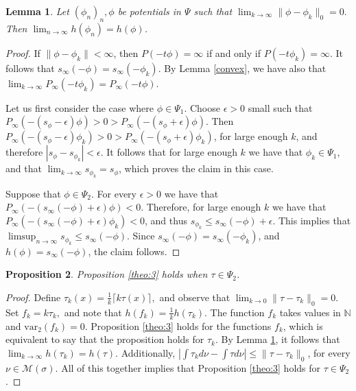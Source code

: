 \documentclass[letterpaper,11pt]{amsart}
\theoremstyle{plain}
\theoremstyle{plain}
\newtheorem{proposition}{Proposition}[subsection]
\newtheorem{lemma}[proposition]{Lemma}
\theoremstyle{definition}
\theoremstyle{remark}
\def\N{{\mathbb N}}
\def\M{{\mathcal M}}
\begin{document}
\begin{lemma}\label{lem:qk} Let $(\phi_n)_n, \phi$ be potentials in $\Psi$  such that $\lim_{k\to\infty}\|\phi-\phi_k\|_0=0.$ Then $\lim_{n\to\infty}h(\phi_n)=h(\phi)$.\end{lemma}

\begin{proof} If $\|\phi-\phi_k\|<\infty$, then $P(-t\phi)=\infty$ if and only if $P(-t\phi_k)=\infty$. It follows that $s_\infty(-\phi)=s_\infty(-\phi_k)$. 
By Lemma \ref{convex}, we have also that $\lim_{k\to\infty} P_\infty(-t\phi_k)=P_\infty(-t\phi)$.

Let us first consider the case where $\phi\in\Psi_1$. Choose $\epsilon>0$ small such that $P_\infty(-(s_\phi-\epsilon)\phi)>0>P_\infty(-(s_\phi+\epsilon)\phi)$. Then $P_\infty(-(s_\phi-\epsilon)\phi_k)>0>P_\infty(-(s_\phi+\epsilon)\phi_k)$, for large enough $k$, and therefore $|s_\phi-s_{\phi_k}|<\epsilon$. It follows that for large enough $k$ we have that $\phi_k\in\Psi_1$, and that $\lim_{k\to\infty}s_{\phi_k}=s_\phi$, which proves the claim in this case.

Suppose that $\phi\in\Psi_2$. For every $\epsilon>0$ we have that $P_\infty(-(s_\infty(-\phi)+\epsilon)\phi)<0$.  Therefore, for large enough $k$ we have that $P_\infty(-(s_\infty(-\phi)+\epsilon)\phi_k)<0$, and thus $s_{\phi_k}\le s_\infty(-\phi)+\epsilon$. This implies that $\limsup_{n\to\infty} s_{\phi_k}\le s_\infty(-\phi)$. Since $s_\infty(-\phi)=s_\infty(-\phi_k)$, and $h(\phi)=s_\infty(-\phi)$, the claim follows.
\end{proof}

\begin{proposition}\label{lem:lc2} Proposition \ref{theo:3} holds when $\tau\in\Psi_2$.
\end{proposition}
\begin{proof} Define $\tau_k(x)=\frac{1}{k}\lceil  k\tau(x)\rceil,$ and observe that $\lim_{k\to 0}\|\tau-\tau_k\|_0=0$. Set $f_k=k\tau_k,$ and note that $h(f_k)=\frac{1}{k}h(\tau_k)$. The function $f_k$ takes values in $\N$ and $\text{var}_2(f_k)=0$. Proposition \ref{theo:3} holds for the functions $f_k$, which is equivalent to say that the proposition holds for $\tau_k$. By Lemma \ref{lem:qk}, it follows that $\lim_{k\to\infty}h(\tau_k)=h(\tau)$. Additionally, $|\int \tau_k d\nu-\int \tau d\nu|\le \|\tau-\tau_k\|_0$, for every $\nu\in\M(\sigma)$. All of this together implies that Proposition \ref{theo:3} holds for $\tau\in\Psi_2$.
\end{proof}
\end{document}

